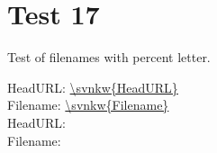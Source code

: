 \documentclass[12pt]{report}
\begin{document}
\chapter{Test 17}
Test of filenames with percent letter.

\noindent
HeadURL: \url{\svnkw{HeadURL}} \\
Filename: \url{\svnkw{Filename}} \\

\noindent
HeadURL:  \\
Filename:  \\
\end{document}
